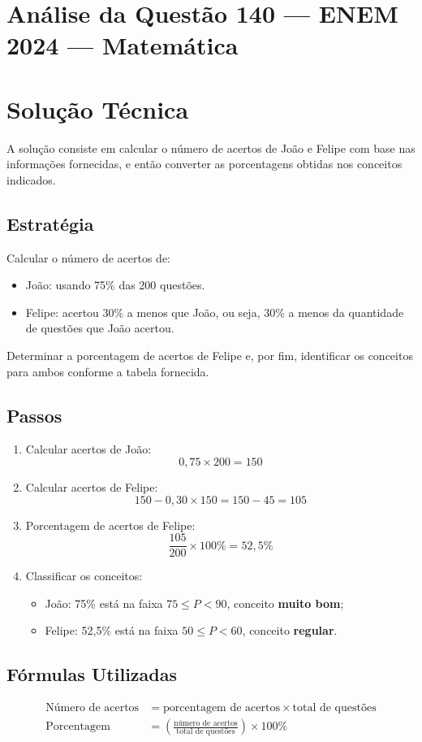 \documentclass{article}
\begin{document}
\section*{Análise da Questão 140 — ENEM 2024 — Matemática}

\section{Solução Técnica}

A solução consiste em calcular o número de acertos de João e Felipe com base nas informações fornecidas, e então converter as porcentagens obtidas nos conceitos indicados.

\subsection{Estratégia}
Calcular o número de acertos de:
\begin{itemize}
  \item João: usando 75\% das 200 questões.
  \item Felipe: acertou 30\% a menos que João, ou seja, 30\% a menos da quantidade de questões que João acertou.
\end{itemize}
Determinar a porcentagem de acertos de Felipe e, por fim, identificar os conceitos para ambos conforme a tabela fornecida.

\subsection{Passos}
\begin{enumerate}
  \item Calcular acertos de João:
  \[
    0,75 \times 200 = 150
  \]
  \item Calcular acertos de Felipe:
  \[
    150 - 0,30 \times 150 = 150 - 45 = 105
  \]
  \item Porcentagem de acertos de Felipe:
  \[
    \frac{105}{200} \times 100\% = 52{,}5\%
  \]
  \item Classificar os conceitos:
  \begin{itemize}
    \item João: 75\% está na faixa \(75 \leq P < 90\), conceito \textbf{muito bom};
    \item Felipe: 52{,}5\% está na faixa \(50 \leq P < 60\), conceito \textbf{regular}.
  \end{itemize}
\end{enumerate}

\subsection{Fórmulas Utilizadas}
\begin{align*}
\text{Número de acertos} &= \text{porcentagem de acertos} \times \text{total de questões} \\
\text{Porcentagem} &= \left( \frac{\text{número de acertos}}{\text{total de questões}} \right) \times 100\%
\end{align*}
\end{document}
